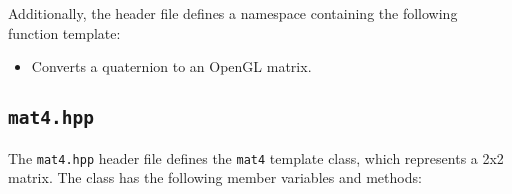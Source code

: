 \documentclass[a4paper,onecolumn,11pt]{doofus}
\begin{document}
Additionally, the header file defines a namespace containing the following function template:

\begin{itemize}
\item {} Converts a quaternion to an OpenGL matrix.
\end{itemize}



\subsection{\texttt{mat4.hpp}}

The \texttt{mat4.hpp} header file defines the \texttt{mat4} template class, which represents a 2x2 matrix. The class has the following member variables and methods:
\end{document}

